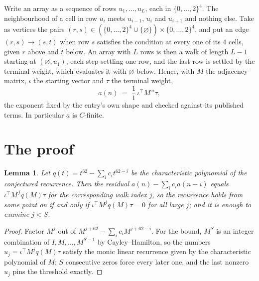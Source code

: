 \documentclass[11pt,a4paper]{article}
\theoremstyle{plain}
\newtheorem{lemma}[theorem]{Lemma}
\theoremstyle{definition}
\begin{document}
Write an array as a sequence of rows $u_1,\dots,u_L$, each in
$\{0,\dots,2\}^{4}$. The neighbourhood of a cell in row $u_i$ meets $u_{i-1}$,
$u_i$ and $u_{i+1}$ and nothing else. Take as vertices the pairs
$(r,s)\in(\{0,\dots,2\}^{4}\cup\{\varnothing\})\times\{0,\dots,2\}^{4}$,
and put an edge $(r,s)\to(s,t)$ when row $s$ satisfies the condition at every one of its
$4$ cells, given $r$ above and $t$ below. An array with $L$ rows is then a walk of length
$L-1$ starting at $(\varnothing,u_1)$, each step settling one row, and the last row is
settled by the terminal weight, which evaluates it with $\varnothing$ below. Hence,
with $M$ the adjacency matrix, $\iota$ the starting vector and $\tau$ the terminal weight,
\[
a(n)\;=\;\frac{1}{1}\,\iota^{\!\top}M^{\,n}\tau ,
\]
the exponent fixed by the entry's own shape and checked against its published terms. In
particular $a$ is $C$-finite.

\section{The proof}

\begin{lemma}\label{lem:crit}
Let $q(t)=t^{62}-\sum_i c_it^{62-i}$ be the characteristic polynomial of the
conjectured recurrence. Then the residual $a(n)-\sum_ic_ia(n-i)$ equals
$\iota^{\!\top}M^{\,j}q(M)\tau$ for the corresponding walk index $j$, so the
recurrence holds from some point on if and only if $\iota^{\!\top}M^{j}q(M)\tau=0$ for all
large $j$; and it is enough to examine $j<S$.
\end{lemma}

\begin{proof}
Factor $M^{j}$ out of $M^{j+62}-\sum_ic_iM^{j+62-i}$. For the bound, $M^{S}$
is an integer combination of $I,M,\dots,M^{S-1}$ by Cayley--Hamilton, so the numbers
$u_j=\iota^{\!\top}M^{j}q(M)\tau$ satisfy the monic linear recurrence given by the
characteristic polynomial of $M$; $S$ consecutive zeros force every later one, and the last
nonzero $u_j$ pins the threshold exactly.
\end{proof}
\end{document}
